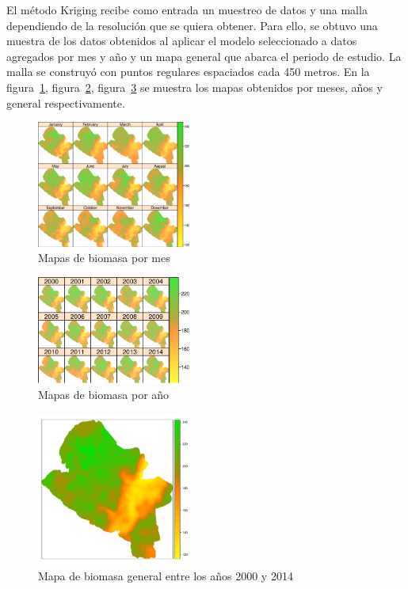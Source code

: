 El método Kriging recibe como entrada un muestreo de datos y una malla dependiendo de la resolución que se quiera obtener. Para ello, se obtuvo una muestra de los datos obtenidos al aplicar el modelo seleccionado a datos agregados por mes y año y un mapa general que abarca el periodo de estudio.  La malla se construyó con puntos regulares espaciados cada 450 metros. En la figura~\ref{fig:biomasaMes}, figura~\ref{fig:biomasaAnio}, figura~\ref{fig:biomasaTotal}  se muestra los mapas obtenidos por meses, años y general respectivamente. 
 
\begin{figure}
  \centering
  \includegraphics[width = 0.45\textwidth]{mapMonthsBiomass.pdf}
  \caption{Mapas de biomasa por mes}
  \label{fig:biomasaMes}
\end{figure}

\begin{figure}
  \centering
  \includegraphics[width = 0.45\textwidth]{mapYearsBiomass.pdf}
  \caption{Mapas de biomasa por año}
  \label{fig:biomasaAnio}
\end{figure}

\begin{figure}
  \centering
  \includegraphics[width = 0.45\textwidth]{mapGeneralBiomass.pdf}
  \caption{Mapa de biomasa general entre los años 2000 y 2014}
  \label{fig:biomasaTotal}
\end{figure}
